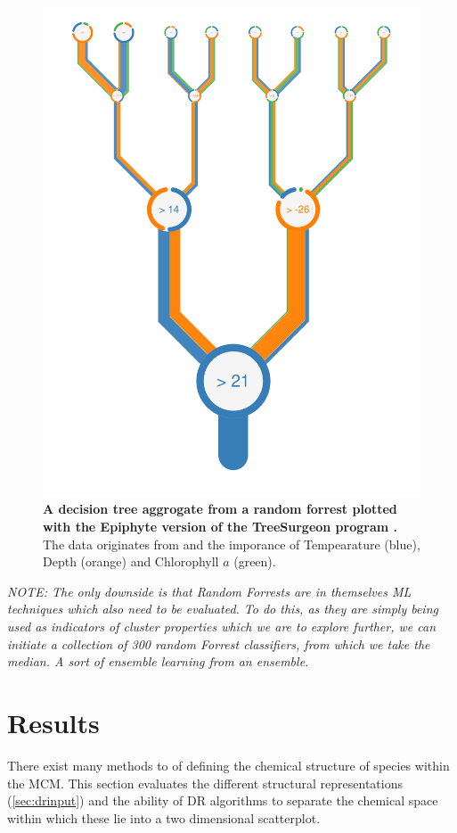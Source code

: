\begin{figure}[H]
     \centering
         \includegraphics[width=.55\textwidth]{4fig/Oi_prj_features_of_RFR(TEMP+DEPTH+ChlrA)_for_depth_5_white.pdf}
        \caption{\textbf{A decision tree aggrogate from a random forrest plotted with the Epiphyte version of the TreeSurgeon program \citep{forrester}.} The data originates from \cite{iodene} and the imporance of Tempearature (blue), Depth (orange) and Chlorophyll $a$ (green).}
        \label{fig:iodenetree}
\end{figure}


%

\textit{NOTE: The only downside is that Random Forrests are in themselves ML techniques which also need to be evaluated. To do this, as they are simply being used as indicators of cluster properties which we are to explore further, we can initiate a collection of 300 random Forrest classifiers, from which we take the median. A sort of ensemble learning from an ensemble. }


\section{Results}\label{sec:drres}
%
There exist many methods to of defining the chemical structure of species within the MCM. This section evaluates the different structural representations (\autoref{sec:drinput}) and the ability of DR algorithms to separate the chemical space within which these lie into a two dimensional scatterplot. 

